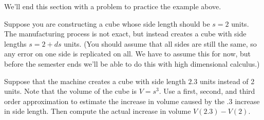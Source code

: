  We'll end this section with a problem to practice the example above.
 
 \begin{problem}
 Suppose you are constructing a cube whose side length should be $s=2$ units. The manufacturing process is not exact, but instead creates a cube with side lengths $s=2+ds$ units. (You should assume that all sides are still the same, so any error on one side is replicated on all.  We have to assume this for now, but before the semester ends we'll be able to do this with high dimensional calculus.) 
 
  Suppose that the machine creates a cube with side length $2.3$ units instead of 2 units.  Note that the volume of the cube is $V=s^3$.  Use a first, second, and third order approximation to estimate the increase in volume caused by the .3 increase in side length.  Then compute the actual increase in volume $V(2.3)-V(2)$.   
 \end{problem}

